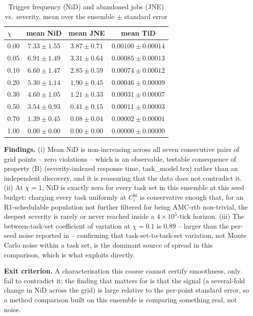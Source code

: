 \documentclass{article}
\begin{document}
\begin{table}[h]
\centering
\caption{Trigger frequency (NiD) and abandoned jobs (JNE) vs.\ severity, mean over the ensemble $\pm$ standard error}
\begin{tabular}{lccc}
\toprule
$\chi$ & mean NiD & mean JNE & mean TiD \\
\midrule
0.00 & $7.33 \pm 1.55$ & $3.87 \pm 0.71$ & $0.00100 \pm 0.00014$ \\
0.05 & $6.91 \pm 1.49$ & $3.31 \pm 0.64$ & $0.00085 \pm 0.00013$ \\
0.10 & $6.60 \pm 1.47$ & $2.85 \pm 0.59$ & $0.00074 \pm 0.00012$ \\
0.20 & $5.30 \pm 1.14$ & $1.90 \pm 0.45$ & $0.00046 \pm 0.00009$ \\
0.30 & $4.60 \pm 1.05$ & $1.21 \pm 0.33$ & $0.00031 \pm 0.00007$ \\
0.50 & $3.54 \pm 0.93$ & $0.41 \pm 0.15$ & $0.00011 \pm 0.00003$ \\
0.70 & $1.39 \pm 0.45$ & $0.08 \pm 0.04$ & $0.00002 \pm 0.00001$ \\
1.00 & $0.00 \pm 0.00$ & $0.00 \pm 0.00$ & $0.00000 \pm 0.00000$ \\
\bottomrule
\end{tabular}
\end{table}

\textbf{Findings.} (i) Mean NiD is non-increasing across all seven consecutive
pairs of grid points -- zero violations -- which is an observable, testable
consequence of property (B) (severity-indexed response time, task\_model.tex) rather than an
independent discovery, and it is reassuring that the data does not contradict
it. (ii) At $\chi = 1$, NiD is exactly zero for every task set in this
ensemble at this seed budget: charging every task uniformly at
$C_i^{\mathrm{hi}}$ is conservative enough that, for an R1-schedulable
population not further filtered for being AMC-rtb non-trivial, the deepest
severity is rarely or never reached inside a $4 \times 10^5$-tick horizon.
(iii) The between-task-set coefficient of variation at $\chi = 0.1$ is
$\mathbf{0.89}$ -- larger than the per-seed noise reported in
 -- confirming that task-set-to-task-set variation, not
Monte Carlo noise within a task set, is the dominant source of spread in this
comparison, which is what  exploits directly.

\textbf{Exit criterion.} A characterisation this coarse cannot certify
smoothness, only fail to contradict it; the finding that matters for
 is that the signal (a several-fold change in NiD across
the grid) is large relative to the per-point standard error, so a method
comparison built on this ensemble is comparing something real, not noise.
\end{document}
